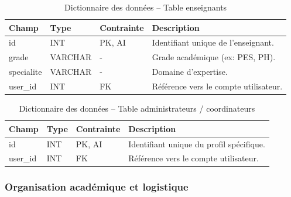 \documentclass[12pt,a4paper]{article}
\begin{document}
\begin{table}[H]
    \centering
    \small
    \begin{tabular}{lp{2cm}lp{6cm}}
        \toprule
        \rowcolor{primary!10}
        \textbf{Champ} & \textbf{Type} & \textbf{Contrainte} & \textbf{Description}                  \\
        \midrule
        id             & INT           & PK, AI              & Identifiant unique de l'enseignant.   \\
        grade          & VARCHAR       & -                   & Grade académique (ex: PES, PH).       \\
        specialite     & VARCHAR       & -                   & Domaine d'expertise.                  \\
        user\_id       & INT           & FK                  & Référence vers le compte utilisateur. \\
        \bottomrule
    \end{tabular}
    \caption{Dictionnaire des données -- Table enseignants}
\end{table}

\begin{table}[H]
    \centering
    \small
    \begin{tabular}{lp{2cm}lp{6cm}}
        \toprule
        \rowcolor{primary!10}
        \textbf{Champ} & \textbf{Type} & \textbf{Contrainte} & \textbf{Description}                     \\
        \midrule
        id             & INT           & PK, AI              & Identifiant unique du profil spécifique. \\
        user\_id       & INT           & FK                  & Référence vers le compte utilisateur.    \\
        \bottomrule
    \end{tabular}
    \caption{Dictionnaire des données -- Table administrateurs / coordinateurs}
\end{table}

\subsubsection{Organisation académique et logistique}
\end{document}

